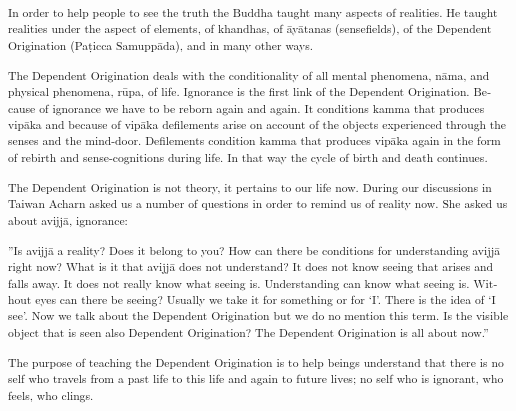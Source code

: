 \textsuperscript{\textdutch{In order to help people to see the truth the
Buddha taught many aspects of realities. He taught realities under the
aspect of elements, of khandhas, of āyātanas (sensefields), of the
Dependent Origination (Paṭicca Samuppāda), and in many other ways. }}

\textsuperscript{\textdutch{The Dependent Origination deals with the
conditionality of all mental phenomena, nāma, and physical phenomena,
rūpa, of life. Ignorance is the first link of the Dependent Origination.
Because of ignorance we have to be reborn again and again. It conditions
kamma that produces vipāka and because of vipāka defilements arise on
account of the objects experienced through the senses and the mind-door.
Defilements condition kamma that produces vipāka again in the form of
rebirth and sense-cognitions during life. In that way the cycle of birth
and death continues. }}

\textsuperscript{\textdutch{The Dependent Origination is not theory, it
pertains to our life now. During our discussions in Taiwan Acharn asked
us a number of questions in order to remind us of reality now. She asked
us about avijjā, ignorance: }}

\textsuperscript{''\textdutch{Is avijjā a reality? Does it belong to
you? How can there be conditions for understanding
}avijj\textdanish{ā}\textdutch{ right now? What is it that
}avijj\textdanish{ā}\textdutch{ does not understand? It does not know
seeing that arises and falls away. It does not really know what seeing
is. Understanding can know what seeing is. Without eyes can there be
seeing? Usually we take it for something or for `I'. There is the idea
of `I see'. Now we talk about the Dependent Origination but we do no
mention this term. Is the visible object that is seen also Dependent
Origination? The Dependent Origination is all about now.''}}

\textsuperscript{\textdutch{The purpose of teaching the Dependent
Origination is to help beings understand that there is no self who
travels from a past life to this life and again to future lives; no self
who is ignorant, who feels, who clings.}}

